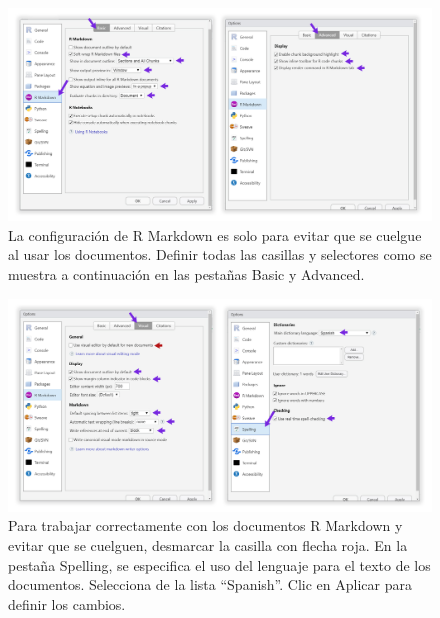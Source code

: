 \documentclass[
]{article}
\theoremstyle{definition}
\theoremstyle{definition}
\theoremstyle{definition}
\theoremstyle{definition}
\theoremstyle{remark}
\begin{document}
\begin{figure}

{\centering \includegraphics[width=1\linewidth]{figs/screenshots/configRStudio-9} 

}

\caption{La configuración de R Markdown es solo para evitar que se cuelgue al usar los documentos. Definir todas las casillas y selectores como se muestra a continuación en las pestañas Basic y Advanced.}\label{fig:figura9}
\end{figure}



\begin{figure}

{\centering \includegraphics[width=1\linewidth]{figs/screenshots/configRStudio-10} 

}

\caption{Para trabajar correctamente con los documentos R Markdown y evitar que se cuelguen, desmarcar la casilla con flecha roja. En la pestaña Spelling, se especifica el uso del lenguaje para el texto de los documentos. Selecciona de la lista ``Spanish''. Clic en Aplicar para definir los cambios.}\label{fig:figura10}
\end{figure}
\end{document}
